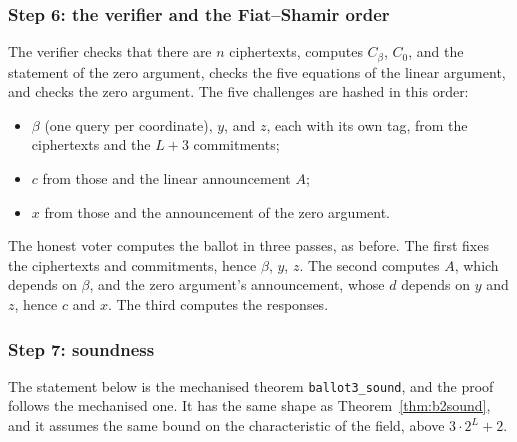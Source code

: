 \documentclass[11pt,a4paper]{article}
\newcommand{\rocq}[1]{\texttt{#1}}
\theoremstyle{remark}
\begin{document}
\subsubsection*{Step 6: the verifier and the Fiat--Shamir order}
The verifier checks that there are $n$ ciphertexts, computes $C_\beta$,
$C_0$, and the statement of the zero argument, checks the five equations
of the linear argument, and checks the zero argument. The five challenges
are hashed in this order:
\begin{itemize}[nosep]
  \item $\beta$ (one query per coordinate), $y$, and $z$, each with its own
  tag, from the ciphertexts and the $L + 3$ commitments;
  \item $c$ from those and the linear announcement $A$;
  \item $x$ from those and the announcement of the zero argument.
\end{itemize}
The honest voter computes the ballot in three passes, as before. The first
fixes the ciphertexts and commitments, hence $\beta$, $y$, $z$. The second
computes $A$, which depends on $\beta$, and the zero argument's
announcement, whose $d$ depends on $y$ and $z$, hence $c$ and $x$. The
third computes the responses.

\subsubsection*{Step 7: soundness}
The statement below is the mechanised theorem \rocq{ballot3\_sound}, and
the proof follows the mechanised one. It has the same shape as
Theorem~\ref{thm:b2sound}, and it assumes the same bound on the
characteristic of the field, above $3 \cdot 2^{L} + 2$.
\end{document}
